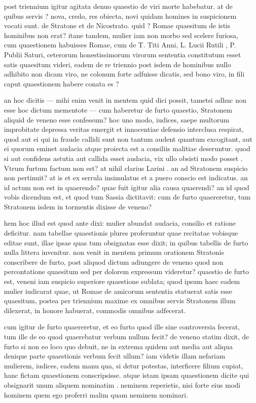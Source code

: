  post triennium igitur agitata denuo quaestio de viri morte habebatur. at de quibus servis ? nova, credo, res obiecta, novi quidam homines in suspicionem vocati sunt. de Stratone et de Nicostrato. quid ? Romae quaesitum de istis hominibus non erat? itane tandem, mulier iam non morbo sed scelere furiosa, cum quaestionem habuisses Romae, cum de T. Titi Anni, L. Lucii Rutili , P. Publii Saturi, ceterorum honestissimorum virorum sententia constitutum esset satis quaesitum videri, eadem de re triennio post isdem de hominibus nullo adhibito non dicam viro, ne colonum forte adfuisse dicatis, sed bono viro, in fili caput quaestionem habere conata es ?

 an hoc dicitis — mihi enim venit in mentem quid dici possit, tametsi adhuc non esse hoc dictum mementote — cum haberetur de furto quaestio, Stratonem aliquid de veneno esse confessum? hoc uno modo, iudices, saepe multorum improbitate depressa veritas emergit et innocentiae defensio interclusa respirat, quod aut ei qui in fraude callidi sunt non tantum audent quantum excogitant, aut ei quorum eminet audacia atque proiecta est a consiliis malitiae deseruntur. quod si aut confidens astutia aut callida esset audacia, vix ullo obsisti modo posset . Vtrum furtum factum non est? at nihil clarius Larini . an ad Stratonem suspicio non pertinuit? at is et ex serrula insimulatus et a puero conscio est indicatus. an id actum non est in quaerendo? quae fuit igitur alia causa quaerendi? an id quod vobis dicendum est, et quod tum Sassia dictitavit: cum de furto quaereretur, tum Stratonem isdem in tormentis dixisse de veneno?

 hem hoc illud est quod ante dixi: mulier abundat audacia, consilio et ratione deficitur. nam tabellae quaestionis plures proferuntur quae recitatae vobisque editae sunt, illae ipsae quas tum obsignatas esse dixit; in quibus tabellis de furto nulla littera invenitur. non venit in mentem primum orationem Stratonis conscribere de furto, post aliquod dictum adiungere de veneno quod non percontatione quaesitum sed per dolorem expressum videretur? quaestio de furto est, veneni iam suspicio superiore quaestione sublata; quod ipsum haec eadem mulier iudicarat quae, ut Romae de amicorum sententia statuerat satis esse quaesitum, postea per triennium maxime ex omnibus servis Stratonem illum dilexerat, in honore habuerat, commodis omnibus adfecerat.

 cum igitur de furto quaereretur, et eo furto quod ille sine controversia fecerat, tum ille de eo quod quaerebatur verbum nullum fecit? de veneno statim dixit, de furto si non eo loco quo debuit, ne in extrema quidem aut media aut aliqua denique parte quaestionis verbum fecit ullum? iam videtis illam nefariam mulierem, iudices, eadem manu qua, si detur potestas, interficere filium cupiat, hanc fictam quaestionem conscripsisse. atque istam ipsam quaestionem dicite qui obsignarit unum aliquem nominatim . neminem reperietis, nisi forte eius modi hominem quem ego proferri malim quam neminem nominari.


